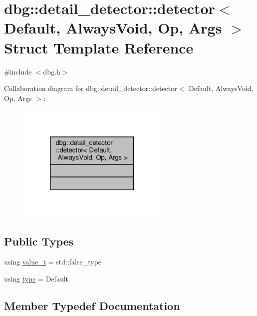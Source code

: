 \hypertarget{structdbg_1_1detail__detector_1_1detector}{}\section{dbg\+:\+:detail\+\_\+detector\+:\+:detector$<$ Default, Always\+Void, Op, Args $>$ Struct Template Reference}
\label{structdbg_1_1detail__detector_1_1detector}


{\ttfamily \#include $<$dbg.\+h$>$}



Collaboration diagram for dbg\+:\+:detail\+\_\+detector\+:\+:detector$<$ Default, Always\+Void, Op, Args $>$\+:\nopagebreak
\begin{figure}[H]
\begin{center}
\leavevmode
\includegraphics[width=205pt]{d8/d4f/structdbg_1_1detail__detector_1_1detector__coll__graph}
\end{center}
\end{figure}
\subsection*{Public Types}
\begin{DoxyCompactItemize}
\item 
using \hyperlink{structdbg_1_1detail__detector_1_1detector_af1b6da4282d723669e926c52f446a989}{value\+\_\+t} = std\+::false\+\_\+type
\item 
using \hyperlink{structdbg_1_1detail__detector_1_1detector_aab6b446944545683b9533ea8fc623480}{type} = Default
\end{DoxyCompactItemize}


\subsection{Member Typedef Documentation}
\mbox{\label{structdbg_1_1detail__detector_1_1detector_aab6b446944545683b9533ea8fc623480}} 
